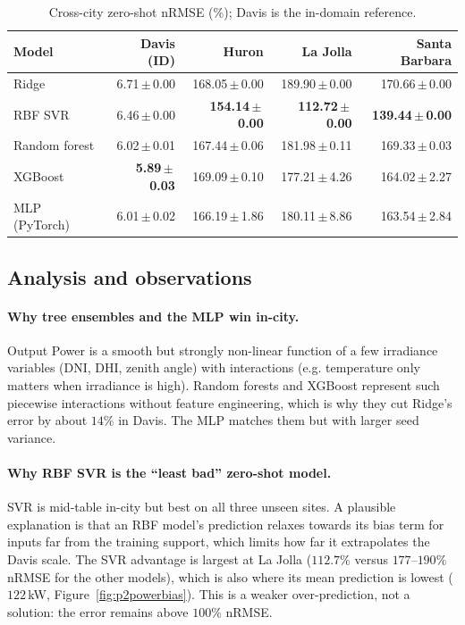 \documentclass[11pt,letterpaper]{article}
\begin{document}
\begin{table}[!htbp]\centering\scriptsize
\setlength{\tabcolsep}{4pt}
\caption{Cross-city zero-shot nRMSE (\%); Davis is the in-domain reference.}\label{tab:p2nrmsecross}
\begin{tabular}{@{}lrrrr@{}}\toprule
\textbf{Model} & \textbf{Davis (ID)} & \textbf{Huron} & \textbf{La Jolla} & \textbf{Santa Barbara}\\\midrule
Ridge & 6.71\,$\pm$\,0.00 & 168.05\,$\pm$\,0.00 & 189.90\,$\pm$\,0.00 & 170.66\,$\pm$\,0.00\\
RBF SVR & 6.46\,$\pm$\,0.00 & \textbf{154.14\,$\pm$\,0.00} & \textbf{112.72\,$\pm$\,0.00} & \textbf{139.44\,$\pm$\,0.00}\\
Random forest & 6.02\,$\pm$\,0.01 & 167.44\,$\pm$\,0.06 & 181.98\,$\pm$\,0.11 & 169.33\,$\pm$\,0.03\\
XGBoost & \textbf{5.89\,$\pm$\,0.03} & 169.09\,$\pm$\,0.10 & 177.21\,$\pm$\,4.26 & 164.02\,$\pm$\,2.27\\
MLP (PyTorch) & 6.01\,$\pm$\,0.02 & 166.19\,$\pm$\,1.86 & 180.11\,$\pm$\,8.86 & 163.54\,$\pm$\,2.84\\
\bottomrule\end{tabular}
\end{table}

\subsection{Analysis and observations}
\paragraph{Why tree ensembles and the MLP win in-city.} Output Power is a smooth but strongly
non-linear function of a few irradiance variables (DNI, DHI, zenith angle) with interactions
(e.g. temperature only matters when irradiance is high). Random forests and XGBoost represent such
piecewise interactions without feature engineering, which is why they cut Ridge's error by about
$14\%$ in Davis. The MLP matches them but with larger seed variance.

\paragraph{Why RBF SVR is the ``least bad'' zero-shot model.} SVR is mid-table in-city but best on
all three unseen sites. A plausible explanation is that an RBF model's prediction relaxes towards
its bias term for inputs far from the training support, which limits how far it extrapolates the
Davis scale. The SVR advantage is largest at La Jolla ($112.7\%$ versus $177$--$190\%$ nRMSE for the
other models), which is also where its mean prediction is lowest ($122$\,kW,
Figure~\ref{fig:p2powerbias}). This is a weaker over-prediction, not a solution: the error remains
above $100\%$ nRMSE.
\end{document}
